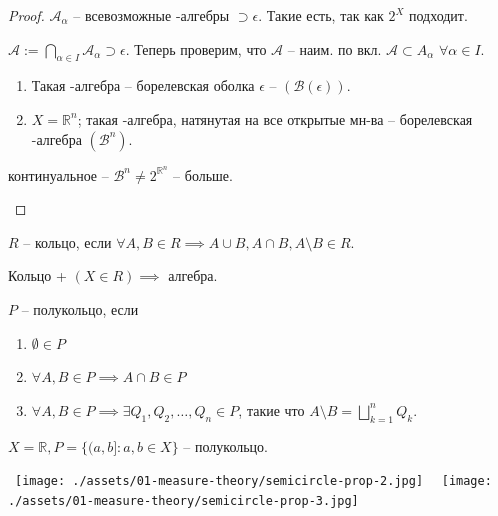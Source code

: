 \begin{proof}
    $\mathcal{A}_{\alpha}$ -- всевозможные \sigma-алгебры $\supset \epsilon$. Такие есть, так как $2^X$ подходит.

    $\mathcal{A} := \bigcap_{\alpha \in I} \mathcal{A}_{\alpha} \supset \epsilon$. Теперь проверим, что $\mathcal{A}$ -- наим. по вкл. $\mathcal{A} \subset A_{\alpha}$ $\forall \alpha \in I$.

    \begin{definition}
        \begin{enumerate}
            \item Такая \sigma-алгебра -- борелевская оболка $\epsilon$ -- $(\mathcal{B}(\epsilon))$.
            
            \item $X = \mathbb{R}^n$; такая \sigma-алгебра, натянутая на все открытые мн-ва -- борелевская \sigma-алгебра $(\mathcal{B}^n)$.
        \end{enumerate}
    \end{definition}

    \begin{remark}
        континуальное -- $\mathcal{B}^n \neq 2^{\mathbb{R}^n}$ -- больше.
    \end{remark}
\end{proof}

\begin{definition}
    $R$ -- кольцо, если $\forall A, B \in R \implies A \cup B, A \cap B, A \setminus B \in R$.
\end{definition}

\begin{remark}
    Кольцо + $(X \in R) \implies$ алгебра.
\end{remark}

\begin{definition}
    $P$ -- полукольцо, если 
    \begin{enumerate}
        \item $\emptyset \in P$
        \item $\forall A, B \in P \implies A \cap B \in P$
        \item $\forall A, B \in P \implies \exists Q_1, Q_2, \dots, Q_n \in P$, такие что $A \setminus B = \bigsqcup_{k = 1}^{n}Q_k$.
    \end{enumerate}
\end{definition}

\begin{example}
    $X = \mathbb{R}, P = \{(a, b] : a, b \in X\}$ -- полукольцо.

    \hbox{
        \texttt{[image: ./assets/01-measure-theory/semicircle-prop-2.jpg]}
    }
    \hbox{
        \texttt{[image: ./assets/01-measure-theory/semicircle-prop-3.jpg]}
    }

\end{example}

